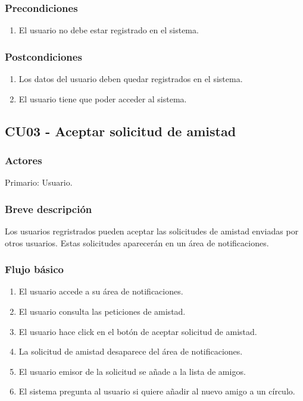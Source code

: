 \documentclass[12pt, a4paper, titlepage]{article}
\begin{document}
\subsubsection{Precondiciones}
\begin{enumerate}
	\item El usuario no debe estar registrado en el sistema.
\end{enumerate}
\subsubsection{Postcondiciones}
\begin{enumerate}
	\item Los datos del usuario deben quedar registrados en el sistema.
	\item El usuario tiene que poder acceder al sistema.
\end{enumerate}


\subsection{CU03 - Aceptar solicitud de amistad}
\subsubsection{Actores}
Primario: Usuario.
\subsubsection{Breve descripción}
Los usuarios regristrados pueden aceptar las solicitudes de amistad enviadas por otros usuarios. Estas solicitudes aparecerán en un área de notificaciones.
\subsubsection{Flujo básico}
\begin{enumerate}
	\item El usuario accede a su área de notificaciones.
	\item El usuario consulta las peticiones de amistad.
	\item El usuario hace click en el botón de aceptar solicitud de amistad.
	\item La solicitud de amistad desaparece del área de notificaciones.
	\item El usuario emisor de la solicitud se añade a la lista de amigos.
	\item El sistema pregunta al usuario si quiere añadir al nuevo amigo a un círculo.
\end{enumerate}
\end{document}
